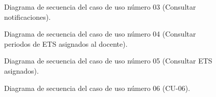 \begin{figure}[htbp!]
	\begin{center}
		\caption{Diagrama de secuencia del caso de uso número 03 (Consultar notificaciones).}
		\label{fig:Diagrama se secuencia CU-03}
	\end{center}
\end{figure}

\begin{figure}[htbp!]
	\begin{center}
		\caption{Diagrama de secuencia del caso de uso número 04 (Consultar periodos de ETS asignados al docente).}
		\label{fig:Diagrama de secuencia CU-04}
	\end{center}
\end{figure}

\begin{figure}[htbp!]
	\begin{center}
		\caption{Diagrama de secuencia del caso de uso número 05 (Consultar ETS asignados).}
		\label{fig:Diagrama de secuencia CU-05}
	\end{center}
\end{figure}

\begin{figure}[htbp!]
	\begin{center}
		\caption{Diagrama de secuencia del caso de uso número 06 (CU-06).}
		\label{fig:Diagrama de secuencia CU-06}
	\end{center}
\end{figure}

